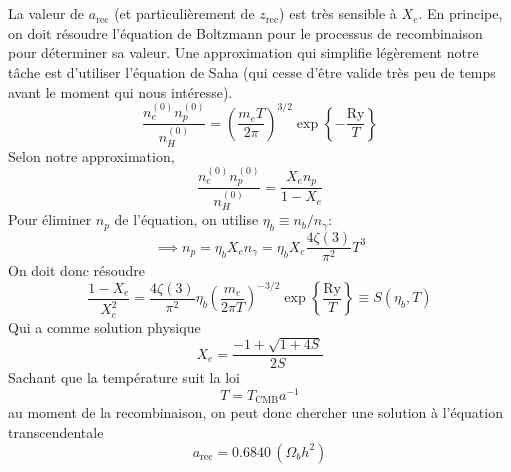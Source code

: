 \documentclass{article}
\numberwithin{equation}{section}
\begin{document}
\section{}
La valeur de $a_{\text{rec}}$ (et particulièrement de $z_{\text{rec}}$) 
est très sensible à $X_e$. En principe, on doit résoudre l'équation de 
Boltzmann pour le processus de recombinaison pour déterminer sa valeur. 
Une approximation qui simplifie légèrement notre tâche est d'utiliser 
l'équation de Saha (qui cesse d'être valide très peu de temps 
avant le moment qui nous intéresse). 
\[
		\frac{n_e^{(0)} n_p^{(0)}}{n_H^{(0)}} 
		= \left( \frac{m_e T}{2 \pi} \right)^{3/2}
		\exp \left\{ -\frac{\text{Ry}}{T} \right\} 
\]
Selon notre approximation,
\[
		\frac{n_e^{(0)} n_p^{(0)}}{n_H^{(0)}}
		= \frac{X_en_p}{1 - X_e}
\]
Pour éliminer $n_p$ de l'équation, on utilise $\eta_b \equiv n_b / n_\gamma$:
\[
		\implies n_p = \eta_b X_e n_\gamma = \eta_b X_e\frac{4 \zeta(3)}{\pi^2}T^3
\]
On doit donc résoudre
\[
		\frac{1 - X_e}{X_e^2} = \frac{4 \zeta(3)}{\pi^2}\eta_b \left( \frac{m_e}{2 \pi T} \right)^{-3/2}
		\exp \left\{ \frac{\text{Ry}}{T} \right\} \equiv S(\eta_b, T)
\]
Qui a comme solution physique
\[
		X_e = \frac{-1 + \sqrt{1 + 4S}}{2S}
\]
Sachant que la température suit la loi
\[
		T = T_{\text{CMB}}a^{-1}
\]
au moment de la recombinaison, on peut donc chercher une solution 
à l'équation transcendentale 
\[
		a_{\text{rec}} = 0.6840\, (\Omega_b h^2)
\]
\end{document}
